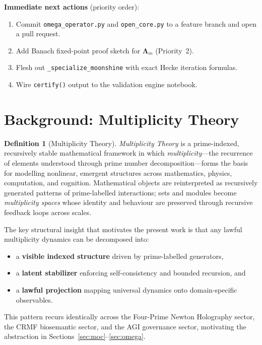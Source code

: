 \documentclass[12pt,a4paper]{article}
\theoremstyle{plain}
\theoremstyle{definition}
\newtheorem{definition}[theorem]{Definition}
\theoremstyle{remark}
\newcommand{\Lam}{\boldsymbol{\Lambda}_m}
\begin{document}
\medskip
\noindent\textbf{Immediate next actions} (priority order):
\begin{enumerate}[leftmargin=*]
  \item Commit \texttt{omega\_operator.py} and \texttt{open\_core.py} to
        a feature branch and open a pull request.
  \item Add Banach fixed-point proof sketch for $\Lam$ (Priority~2).
  \item Flesh out \texttt{\_specialize\_moonshine} with exact Hecke
        iteration formulas.
  \item Wire \texttt{certify()} output to the validation engine notebook.
\end{enumerate}

\section{Background: Multiplicity Theory}
\label{sec:background}

\begin{definition}[Multiplicity Theory]
\emph{Multiplicity Theory} is a prime-indexed, recursively stable
mathematical framework in which \emph{multiplicity}---the recurrence
of elements understood through prime number decomposition---forms the
basis for modelling nonlinear, emergent structures across mathematics,
physics, computation, and cognition. Mathematical objects are
reinterpreted as recursively generated patterns of prime-labelled
interactions; sets and modules become \emph{multiplicity spaces} whose
identity and behaviour are preserved through recursive feedback loops
across scales.
\end{definition}

The key structural insight that motivates the present work is that any
lawful multiplicity dynamics can be decomposed into:
\begin{itemize}
  \item a \textbf{visible indexed structure} driven by prime-labelled
        generators,
  \item a \textbf{latent stabilizer} enforcing self-consistency and
        bounded recursion, and
  \item a \textbf{lawful projection} mapping universal dynamics onto
        domain-specific observables.
\end{itemize}
This pattern recurs identically across the Four-Prime Newton Holography
sector, the CRMF biosemantic sector, and the AGI governance sector,
motivating the abstraction in Sections~\ref{sec:moc}--\ref{sec:omega}.
\end{document}
